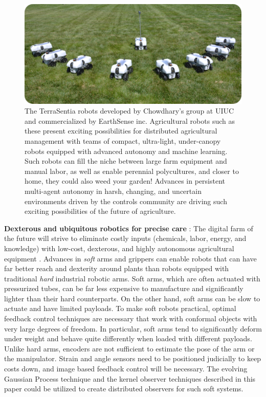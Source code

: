 \documentclass[letterpaper,12pt,peerreviewca,draftcls]{IEEEtran}
\begin{document}
\begin{figure}
\includegraphics[width=\textwidth]{"Figure S1"}
\caption{The TerraSentia robots developed by Chowdhary's group at UIUC and commercialized by EarthSense inc. Agricultural robots such as these present exciting possibilities for distributed agricultural management with teams of compact, ultra-light, under-canopy robots equipped with advanced autonomy and machine learning. Such robots can fill the niche between large farm equipment and manual labor, as well as enable perennial polycultures, and closer to home,  they could also weed your garden! Advances in persistent multi-agent autonomy in harsh, changing, and uncertain environments driven by the controls community are driving such exciting possibilities of the future of agriculture.}
\label{fig:terrasentia}
\end{figure}



\textbf{Dexterous and ubiquitous robotics for precise care} : The digital farm of the future will strive to eliminate costly inputs (chemicals, labor, energy, and knowledge) with low-cost, dexterous, and highly autonomous agricultural equipment \cite{pedersen2006agricultural}. Advances in \textit{soft} arms and grippers can enable robots that can have far better reach and dexterity around plants than robots equipped with traditional \textit{hard} industrial robotic arms. Soft arms, which are often actuated with pressurized tubes, can be far less expensive to manufacture and significantly lighter than their hard counterparts. On the other hand, soft arms can be slow to actuate and have limited payloads. To make soft robots practical, optimal feedback control techniques are necessary that work with conformal objects with very large degrees of freedom. In particular, soft arms tend to significantly deform under weight and behave quite differently when loaded with different payloads. Unlike hard arms, encoders are not sufficient to estimate the pose of the arm or the manipulator. Strain and angle sensors need to be positioned judicially to keep costs down, and image based feedback control will be necessary. The evolving Gaussian Process technique and the kernel observer techniques described in this paper could be utilized to create distributed observers for such soft systems.  
\end{document}
